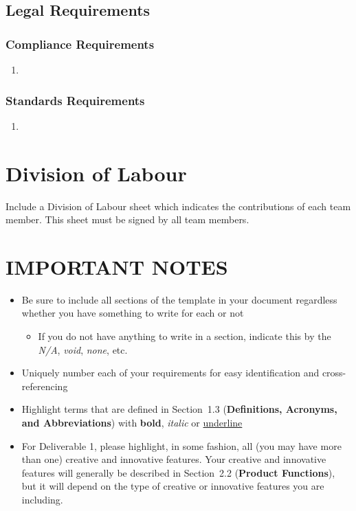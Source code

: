 \documentclass[]{article}
\begin{document}

\subsection{Legal Requirements}
\label{sub:legal_requirements}

\subsubsection{Compliance Requirements}
\label{ssub:compliance_requirements}
\begin{enumerate}[{LR}1. ]
	\item 
\end{enumerate}

\subsubsection{Standards Requirements}
\label{ssub:standards_requirements}
\begin{enumerate}[{LR}1. ]
	\item 
\end{enumerate}



\appendix
\section{Division of Labour}
\label{sec:division_of_labour}
Include a Division of Labour sheet which indicates the contributions of each team member. This sheet must be signed by all team members.

\newpage
\section*{IMPORTANT NOTES}
\begin{itemize}
	\item Be sure to include all sections of the template in your document regardless whether you have something to write for each or not
	\begin{itemize}
		\item If you do not have anything to write in a section, indicate this by the \emph{N/A}, \emph{void}, \emph{none}, etc.
	\end{itemize}
	\item Uniquely number each of your requirements for easy identification and cross-referencing
	\item Highlight terms that are defined in Section~1.3 (\textbf{Definitions, Acronyms, and Abbreviations}) with \textbf{bold}, \emph{italic} or \underline{underline}
	\item For Deliverable 1, please highlight, in some fashion, all (you may have more than one) creative and innovative features. Your creative and innovative features will generally be described in Section~2.2 (\textbf{Product Functions}), but it will depend on the type of creative or innovative features you are including.
\end{itemize}
\end{document}
